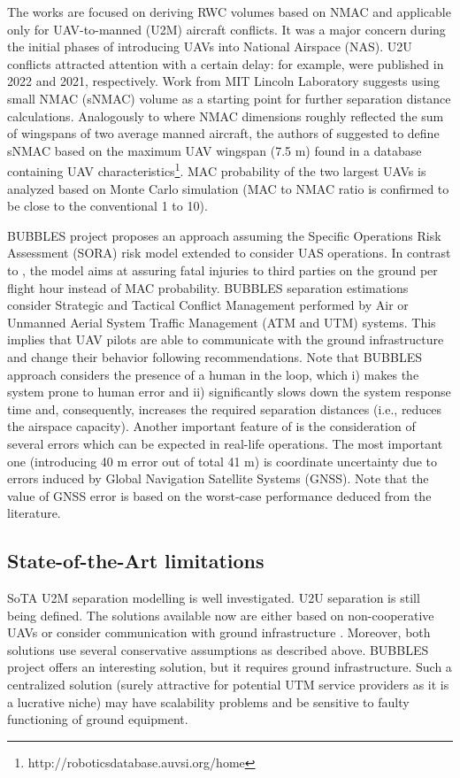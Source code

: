 \documentclass[conference]{IEEEtran}
\begin{document}
The works \cite{Assure,Weinert16,Cook15,Weinert18} are focused on deriving RWC volumes based on NMAC and applicable only for UAV-to-manned (U2M) aircraft conflicts. It was a major concern during the initial phases of introducing UAVs into National Airspace (NAS).
U2U conflicts attracted attention with a certain delay: for example, \cite{Weinert22,Bubbles21} were published in 2022 and 2021, respectively. Work \cite{Weinert22} from MIT Lincoln Laboratory suggests using small NMAC (sNMAC) volume as a starting point for further separation distance calculations. Analogously to \cite{NMAC_sg} where NMAC dimensions roughly reflected the sum of wingspans of two average manned aircraft, the authors of \cite{Weinert22} suggested to define sNMAC  based on the maximum UAV wingspan (7.5 m) found in a database containing UAV characteristics\footnote{http://roboticsdatabase.auvsi.org/home}. 
MAC probability of the two largest UAVs is analyzed based on Monte Carlo simulation (MAC to NMAC ratio is confirmed to be close to the conventional 1 to 10). 

BUBBLES project proposes an approach assuming the Specific Operations Risk Assessment (SORA) risk model \cite{Jarus19} extended to consider UAS operations. 
In contrast to \cite{Assure,Weinert16,Cook15,Weinert18,Weinert22}, the model aims at assuring fatal injuries to third parties on the ground per flight hour instead of MAC probability. 
BUBBLES separation estimations consider Strategic and Tactical Conflict Management \cite{icao_deconf, Vinogradov20} performed by Air or Unmanned Aerial System Traffic Management (ATM and UTM) systems. 
This implies that UAV pilots are able to communicate with the ground infrastructure and change their behavior following recommendations. 
Note that BUBBLES approach considers the presence of a human in the loop, which i) makes the system prone to human error and ii) significantly slows down the system response time and, consequently, increases the required separation distances (i.e., reduces the airspace capacity). 
Another important feature of \cite{Bubbles21} is the consideration of several errors which can be expected in real-life operations. 
The most important one (introducing 40 m error out of total 41 m) is coordinate uncertainty due to errors induced by Global Navigation Satellite Systems (GNSS). 
Note that the value of GNSS error is based on the worst-case performance deduced from the literature.

\subsection{State-of-the-Art limitations}
SoTA U2M separation modelling is well investigated. 
U2U separation is still being defined. 
The solutions available now are either based on non-cooperative UAVs \cite{Weinert22} or consider communication with ground infrastructure \cite{Bubbles21}. 
Moreover, both solutions use several conservative assumptions as described above. 
BUBBLES project offers an interesting solution, but it requires ground infrastructure. 
Such a centralized solution (surely attractive for potential UTM service providers as it is a lucrative niche) may have scalability problems and be sensitive to faulty functioning of ground equipment. 
\end{document}
